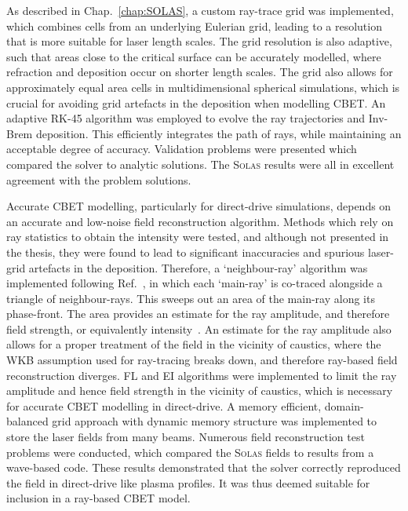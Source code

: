 As described in Chap.~\ref{chap:SOLAS}, a custom ray-trace grid was implemented, which combines cells from an underlying Eulerian grid, leading to a resolution that is more suitable for laser length scales.
The grid resolution is also adaptive, such that areas close to the critical surface can be accurately modelled, where refraction and deposition occur on shorter length scales.
The grid also allows for approximately equal area cells in multidimensional spherical simulations, which is crucial for avoiding grid artefacts in the deposition when modelling \ac{CBET}.
An adaptive RK-45 algorithm was employed to evolve the ray trajectories and \ac{Inv-Brem} deposition.
This efficiently integrates the path of rays, while maintaining an acceptable degree of accuracy.
Validation problems were presented which compared the solver to analytic solutions.
The \textsc{Solas} results were all in excellent agreement with the problem solutions.

Accurate \ac{CBET} modelling, particularly for direct-drive simulations, depends on an accurate and low-noise field reconstruction algorithm.
Methods which rely on ray statistics to obtain the intensity were tested, and although not presented in the thesis, they were found to lead to significant inaccuracies and spurious laser-grid artefacts in the deposition.
Therefore, a `neighbour-ray' algorithm was implemented following Ref.~\cite{follett_validation_2022}, in which each `main-ray' is co-traced alongside a triangle of neighbour-rays.
This sweeps out an area of the main-ray along its phase-front.
The area provides an estimate for the ray amplitude, and therefore field strength, or equivalently intensity~\cite{tracy_ray_2014}.
An estimate for the ray amplitude also allows for a proper treatment of the field in the vicinity of caustics, where the WKB assumption used for ray-tracing breaks down, and therefore ray-based field reconstruction diverges.
\ac{FL} and \ac{EI} algorithms were implemented to limit the ray amplitude and hence field strength in the vicinity of caustics, which is necessary for accurate \ac{CBET} modelling in direct-drive.
A memory efficient, domain-balanced grid approach with dynamic memory structure was implemented to store the laser fields from many beams.
Numerous field reconstruction test problems were conducted, which compared the \textsc{Solas} fields to results from a wave-based code.
These results demonstrated that the solver correctly reproduced the field in direct-drive like plasma profiles.
It was thus deemed suitable for inclusion in a ray-based \ac{CBET} model.

